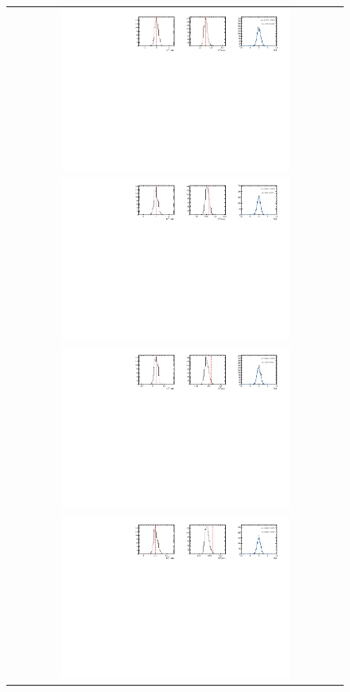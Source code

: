 \begin{figure}
  \centering
  \begin{tabular}{c}
\includegraphics[width=0.7\textwidth]{ANA_resources/Plots/Data_fit/FitterBias//A_signal_pipipipi_run2.pdf} \\
\includegraphics[width=0.7\textwidth]{ANA_resources/Plots/Data_fit/FitterBias//R_signal_pipipipi_run2.pdf} \\
\includegraphics[width=0.7\textwidth]{ANA_resources/Plots/Data_fit/FitterBias//A_Bs_pipipipi_run2.pdf} \\
\includegraphics[width=0.7\textwidth]{ANA_resources/Plots/Data_fit/FitterBias//R_ds_pipipipi_run2.pdf} \\

\end{tabular}
\end{figure}
